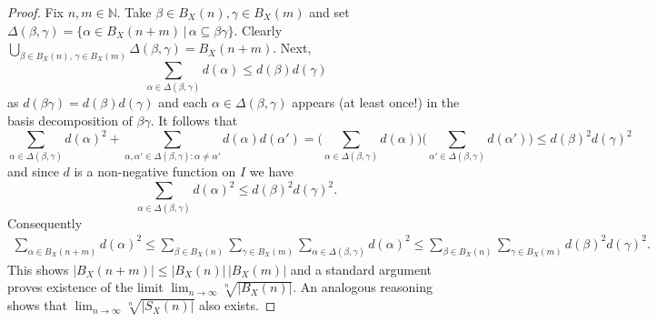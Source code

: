 \documentclass[11 pt, leqno]{amsart}
\newcommand{\NN}{\mathbb{N}}
\theoremstyle{definition}
\numberwithin{equation}{section}
\begin{document}
\begin{proof}
	Fix $n,m\in\NN$. Take $\beta\in B_X(n),\gamma\in B_X(m)$ and set $\Delta(\beta,\gamma)=\{\alpha\in B_X(n+m)\,|\, \alpha\subseteq \beta\gamma\}$. Clearly $\bigcup_{\beta\in B_X(n),\,\gamma\in B_X(m)} \Delta(\beta,\gamma)=B_X(n+m)$. Next,
	\[
	\sum_{\alpha\in \Delta(\beta,\gamma)}d(\alpha) \le d(\beta) d(\gamma)
	\]
	as $ d(\beta\gamma)=d(\beta)d(\gamma)$ and each $\alpha \in \Delta(\beta,\gamma)$ appears (at least once!) in the basis decomposition of $\beta \gamma$. It follows that
	\[
	\sum_{\alpha\in \Delta(\beta,\gamma)} d(\alpha)^2 + \sum_{\alpha,\alpha'\in \Delta(\beta,\gamma)\colon\alpha\neq \alpha'}
	\!\!\!\! d(\alpha) d(\alpha') 
	=
	\bigl(
	\sum_{\alpha\in \Delta(\beta,\gamma)}d(\alpha) 
	\bigr)
	\bigl(
	\sum_{\alpha'\in \Delta(\beta,\gamma)}d(\alpha') 
	\bigr)\le d(\beta)^2 d(\gamma)^2
	\]
	and since $d$ is a non-negative function on $I$ we have
	\[
	\sum_{\alpha\in \Delta(\beta,\gamma)} d(\alpha)^2 
	\le d(\beta)^2 d(\gamma)^2.
	\]
	Consequently
	\[\begin{split}
	\sum_{\alpha\in B_X(n+m)} d(\alpha)^2\le 
	\sum_{\beta\in B_X(n)}\sum_{\gamma\in B_X(m)} \sum_{\alpha\in \Delta(\beta,\gamma)} d(\alpha)^2
	\le \sum_{\beta\in B_X(n)}\sum_{\gamma\in B_X(m)} d(\beta)^2 d(\gamma)^2.
	\end{split}\]
	This shows $|B_X(n+m)|\le |B_X(n)|\,|B_X(m)|$ and a standard argument proves existence of the limit $\lim_{n\to\infty} \sqrt[n]{|B_X(n)|}$.  An analogous reasoning shows that $\lim_{n\to\infty}\sqrt[n]{|S_X(n)|}$ also exists.

\end{proof}
\end{document}
